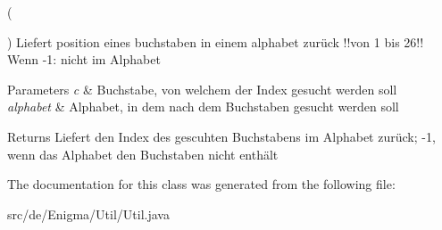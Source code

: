(

) Liefert position eines buchstaben in einem alphabet zurück !!von 1 bis 26!! Wenn -\/1\+: nicht im Alphabet 
\begin{DoxyParams}{Parameters}
{\em c} & Buchstabe, von welchem der Index gesucht werden soll \\
\hline
{\em alphabet} & Alphabet, in dem nach dem Buchstaben gesucht werden soll \\
\hline
\end{DoxyParams}
\begin{DoxyReturn}{Returns}
Liefert den Index des gescuhten Buchstabens im Alphabet zurück; -\/1, wenn das Alphabet den Buchstaben nicht enthält 
\end{DoxyReturn}


The documentation for this class was generated from the following file\+:\begin{DoxyCompactItemize}
\item 
src/de/\+Enigma/\+Util/Util.\+java\end{DoxyCompactItemize}
